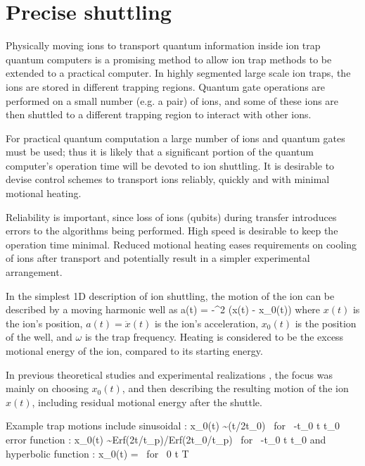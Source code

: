 \section{Precise shuttling}
\label{sec:preciseshuttle}

Physically moving ions to transport quantum information inside ion trap quantum computers is a promising method to allow ion trap methods to be extended to a practical computer. In highly segmented large scale ion traps, the ions are stored in different trapping regions. Quantum gate operations are performed on a small number (e.g. a pair) of ions, and some of these ions are then shuttled to a different trapping region to interact with other ions. 

For practical quantum computation a large number of ions and quantum gates must be used; thus it is likely that a significant portion of the quantum computer's operation time will be devoted to ion shuttling. It is desirable to devise control schemes to transport ions reliably, quickly and with minimal motional heating. 

Reliability is important, since loss of ions (qubits) during transfer introduces errors to the algorithms being performed. High speed is desirable to keep the operation time minimal. Reduced motional heating eases requirements on cooling of ions after transport and potentially result in a  simpler experimental arrangement.

In the simplest 1D description of ion shuttling, the motion of the ion can be described by a moving harmonic well as
\be
a(t) = -\omega^2 (x(t) - x_0(t))
\label{eq:movingwell}
\ee
where $x(t)$ is the ion's position, $a(t) = \ddot x(t)$ is the ion's acceleration, $x_0(t)$ is the position of the well, and $\omega$ is the trap frequency. Heating is considered to be the excess motional energy of the ion, compared to its starting energy.

In previous theoretical studies \cite{Reichle2006,Hucul2008} and experimental realizations \cite{Rowe2002,Hensinger2006}, the focus was mainly on choosing $x_0(t)$, and then describing the resulting motion of the ion $x(t)$, including residual motional energy after the shuttle.

Example trap motions include sinusoidal \cite{Reichle2006}:
\be
x_0(t) \sim \sin(t\pi/2t_0) \mbox{  for  } -t_0 \leq t \leq t_0
\ee
error function \cite{Reichle2006}:
\be
x_0(t) \sim \mbox{Erf}(2t/t_p)/\mbox{Erf}(2t_0/t_p) \mbox{ for } -t_0 \leq t \leq t_0
\ee
and hyperbolic function \cite{Hucul2008}:
\be
x_0(t) =  \mbox{ for } 0 \leq t \leq T
\ee

